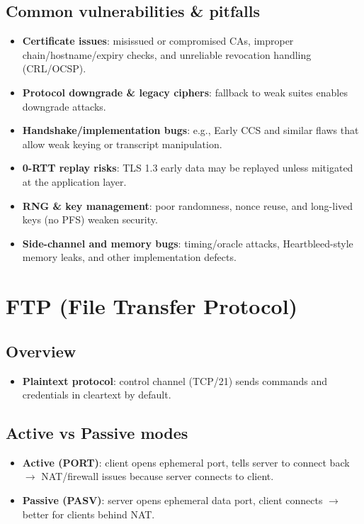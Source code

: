 \documentclass[11pt]{article}
\begin{document}
\subsection{Common vulnerabilities \& pitfalls}
\begin{itemize}
  \item \textbf{Certificate issues}: misissued or compromised CAs, improper chain/hostname/expiry checks, and unreliable revocation handling (CRL/OCSP).
  
  \item \textbf{Protocol downgrade \& legacy ciphers}: fallback to weak suites enables downgrade attacks.
  
  \item \textbf{Handshake/implementation bugs}: e.g., Early CCS and similar flaws that allow weak keying or transcript manipulation.
  
  \item \textbf{0-RTT replay risks}: TLS 1.3 early data may be replayed unless mitigated at the application layer.
  
  \item \textbf{RNG \& key management}: poor randomness, nonce reuse, and long-lived keys (no PFS) weaken security.
  
  \item \textbf{Side-channel and memory bugs}: timing/oracle attacks, Heartbleed-style memory leaks, and other implementation defects.
\end{itemize}

\section{FTP (File Transfer Protocol)}

\subsection{Overview}
\begin{itemize}
  \item \textbf{Plaintext protocol}: control channel (TCP/21) sends commands and credentials in cleartext by default.
\end{itemize}

\subsection{Active vs Passive modes}
\begin{itemize}
  \item \textbf{Active (PORT)}: client opens ephemeral port, tells server to connect back $\rightarrow$ NAT/firewall issues because server connects to client.
  
  \item \textbf{Passive (PASV)}: server opens ephemeral data port, client connects $\rightarrow$ better for clients behind NAT.
\end{itemize}
\end{document}
